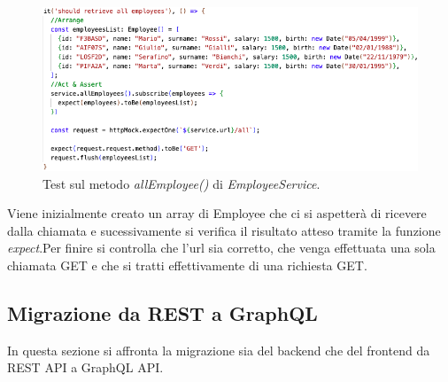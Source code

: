 \begin{figure}[!ht]
\centering
\includegraphics[width=0.8\linewidth]{immagini/allEmployeeTest.png}
\caption{Test sul metodo \textit{allEmployee()} di \textit{EmployeeService}.}
\label{get-all-test}
\end{figure}
\FloatBarrier
Viene inizialmente creato un array di Employee che ci si aspetterà di ricevere dalla chiamata e sucessivamente si verifica il risultato atteso tramite la funzione \textit{expect}.Per finire si controlla che l'url sia corretto, che venga effettuata una sola chiamata GET e che si tratti effettivamente di una richiesta GET.
\subsection{Migrazione da REST a GraphQL}
In questa sezione si affronta la migrazione sia del backend che del frontend da REST API a GraphQL API.
